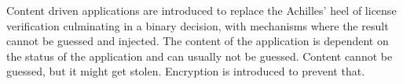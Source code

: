 Content driven applications are introduced to replace the Achilles' heel of license verification culminating in a binary decision, with mechanisms where the result cannot be guessed and injected.
The content of the application is dependent on the status of the application and can usually not be guessed.
\newline
Content cannot be guessed, but it might get stolen. Encryption is introduced to prevent that.
